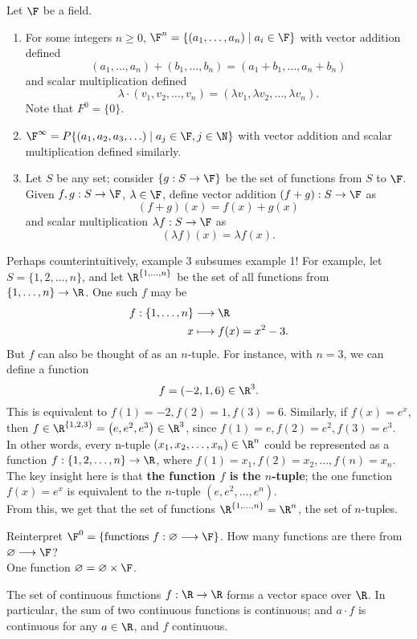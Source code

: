 \documentclass[math0540-lecture-notes.tex]{subfiles}
\begin{document}
\begin{example}
  Let $\F$ be a field.
  \begin{enumerate}
    \item For some integers $n\ge 0$, $\F^{n}=\{\left( a_1,\ldots,a_n \right) \mid a_i\in \F \} $
      with vector addition defined \[
        (a_1,\ldots,a_n)+(b_1,\ldots,b_n) = (a_1+b_1,\ldots,a_n+b_n)
      \] and scalar multiplication defined \[
      \lambda\cdot (v_1,v_2,\ldots,v_n) = (\lambda v_1,\lambda v_2,\ldots,\lambda v_n)
      .\] 
      Note that $ F^{0}=\{ 0 \}$.
    \item $\F^{\infty}=P\{ \left( a_1,a_2,a_3,\ldots \right)\mid a_j\in \F, j\in \N  \}$ with vector
      addition and scalar multiplication defined similarly.
    \item Let $S$ be any set; consider $\{ g:S\to\F \}$ be the set of functions from $S$ to $\F$.
      Given $f,g:S\to \F$, $\lambda\in \F$, define vector addition $(f+g):S\to\F$ as \[
        (f+g)(x) = f(x) + g(x)
      \] and scalar multiplication $ \lambda f:S\to\F$ as \[
      (\lambda f)(x) = \lambda f(x)
      .\] 
  \end{enumerate}
\end{example}
Perhaps counterintuitively, example 3 subsumes example 1! For example, let $S=\{1,2,\ldots,n\}$, and
let $\R^{\{ 1,\ldots,n \}}$ be the set of all functions from $\{ 1,\ldots,n \}\to \R$. One such $f$
may be \begin{align*}
  f: \{ 1,\ldots,n \} &\longrightarrow \R \\
  x &\longmapsto f(x) = x^2-3
.\end{align*} But $f$ can also be thought of as an $n$-tuple. For instance, with $n=3$, we can
define a function \[
  f = (-2,1,6)\in \R^3
.\] This is equivalent to $f(1)=-2,f(2)=1,f(3)=6$. Similarly, if $f(x) =e^{x}$, then $f\in \R^{\{
1,2,3 \}}=\left( e,e^2,e^3 \right) \in \R^3$, since $f(1)=e, f(2)=e^2,f(3)=e^3$. \\

In other words, every n-tuple $\left( x_1,x_2,\ldots,x_n \right) \in \R^n $ could be represented as a
function $f:\{ 1,2,\ldots,n \}\to\R$, where $f(1)=x_1,f(2)=x_2,\ldots,f(n)=x_n$. The key insight here is that
\textbf{the function $f$ is the $n$-tuple}; the one function $f(x)=e^{x}$ is equivalent to the
$n$-tuple $\left( e,e^2,\ldots,e^{n} \right) $.\\

From this, we get that the set of functions $\R^{\{ 1,\ldots,n \}}=\R^{n}$, the set of $n$-tuples.
\begin{remark}
  Reinterpret $\F^{0}=\{\text{functions}~ f:\varnothing\longrightarrow \F \}$. How many functions
  are there from $\varnothing\longrightarrow \F$?\\
  One function $\varnothing=\varnothing\times \F$.
\end{remark}

\begin{example}
  The set of continuous functions $f: \R \to \R$ forms a vector space over $\R$. In particular, the
  sum of two continuous functions is continuous; and $a\cdot f$ is continuous for any $a\in \R$, and
  $f$ continuous.
\end{example}
\end{document}
